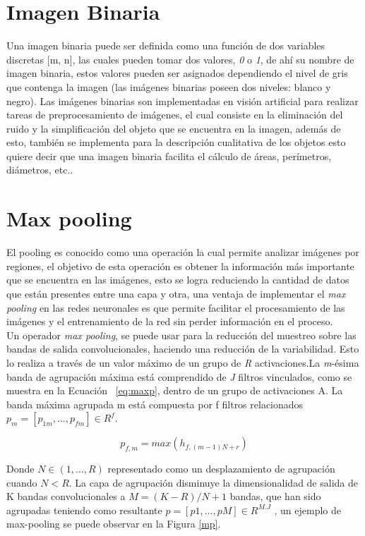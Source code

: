 \section{Imagen Binaria} Una imagen binaria puede ser definida como una función de dos variables discretas [m, n], las cuales pueden tomar dos valores, \textit{0} o \textit{1}, de ahí su nombre de imagen binaria, estos valores pueden ser asignados dependiendo el nivel de gris que contenga la imagen (las imágenes binarias poseen dos niveles: blanco y negro). Las imágenes binarias son implementadas en visión artificial para realizar tareas de preprocesamiento de imágenes, el cual consiste en la eliminación del ruido y la simplificación del objeto que se encuentra en la imagen, además de esto, también se implementa para la descripción cualitativa de los objetos esto quiere decir que una imagen binaria facilita el cálculo de áreas, perímetros, diámetros, etc.\cite{ref_12}.

\section{Max pooling}

El pooling es conocido como una operación la cual permite analizar imágenes por regiones, el objetivo de esta operación es obtener la información más importante que se encuentra en las imágenes, esto se logra reduciendo la cantidad de datos que están presentes entre una capa y otra, una ventaja de implementar el \textit{max pooling} en las redes neuronales es que permite facilitar el procesamiento de las imágenes y el entrenamiento de la red sin perder información en el proceso.\\

Un operador \textit{max pooling}, se puede usar para la reducción del muestreo sobre las bandas de salida convolucionales, haciendo una reducción de la variabilidad. Esto lo realiza a través de un valor máximo de un grupo de \textit{R} activaciones.La \textit{m}-ésima banda de agrupación máxima está comprendido de \textit{J} filtros vinculados, como se muestra en la Ecuación ~\ref{eq:maxp}, dentro de un grupo de activaciones A. La banda máxima agrupada m está compuesta por f filtros relacionados $p_{m}=[p_{1m},...,p_{fm}] \in R^f$.

\begin{equation}
	\label{eq:maxp}
	p_{f,m}=max(h_{f,(m-1)N+r})
\end{equation}

Donde $N \in (1,...,R) $ representado como un desplazamiento de agrupación cuando $N < R$. La capa de agrupación disminuye la dimensionalidad de salida de K bandas convolucionales a $M=(K-R)/N+1$ bandas, que han sido agrupadas teniendo como resultante $p=[p1,...,pM] \in R^{M.J}$ \cite{prakharr0y}, un ejemplo de max-pooling se puede observar en la Figura \ref{mp}.

